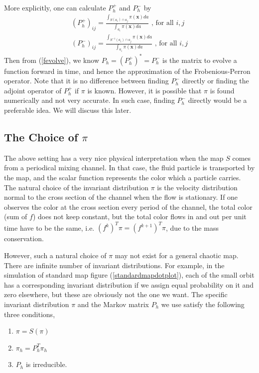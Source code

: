 \documentclass{article}
\begin{document}
More explicitly, one can calculate $P_h^+$ and $P_h^-$ by
\begin{eqnarray}
\label{P definition}
     (P_h^+)_{ij} = \frac{\int_{S(a_i) \cap a_j  } \pi(\mathbf{x})da}{\int_{a_i} \pi(\mathbf{x}) da
     } \mbox{   , for all } i,j\\
     (P_h^-)_{ij} = \frac{\int_{S^{-1}(a_i) \cap a_j  } \pi(\mathbf{x})da}{\int_{a_i} \pi(\mathbf{x}) da \nonumber
     } \mbox{   , for all } i,j
\end{eqnarray}
Then from (\ref{fevolve}), we know $P_h =(P_h^+)^* = P_h^-$ is the matrix to evolve a function forward in time, and hence the
approximation of the Frobenious-Perron operator. Note that it is no difference between finding $P_h^-$ directly or finding the adjoint operator of $P_h^+$ if $\pi$ is known. However, it is possible that $\pi$ is found numerically and not very accurate. In such case, finding $P_h^-$ directly would be a preferable idea. We will discuss this later.

\subsection{The Choice of $\pi$}

The above setting has a very nice physical interpretation when the map $S$ comes from a periodical mixing channel. In that case, the fluid particle is transported by the map, and the scalar function represents the color which a particle carries. The natural choice of the invariant distribution $\pi$ is the velocity distribution normal to the cross section of the channel when the flow is stationary. If one observes the color at the cross section every period of the channel, the total color (sum of $f$) does not keep constant, but the total color flows in and out per unit time have to be the same, i.e.
$(f^k)^T\pi =(f^{k+1})^T\pi$, due to the mass conservation. 

However, such a natural choice of $\pi$ may not exist for a general chaotic map. There are infinite number of invariant distributions. For example, in the simulation of standard map figure (\ref{standardmapdotplot}), each of the small orbit has a corresponding invariant distribution if we assign equal probability on it and zero elsewhere, but these are obviously not the one we want. The specific invariant distribution $\pi$ and the Markov matrix $P_h$ we use satisfy the following three conditions,

\begin{enumerate}
\label{invariant equation}
 \item $\pi = S(\pi)$
 \item $\pi_h= P_h^T \pi_h$
 \item $P_h$ is irreducible.
\end{enumerate}
\end{document}
